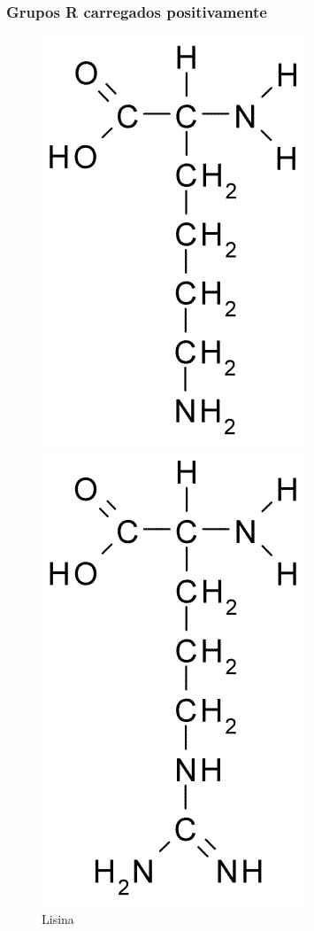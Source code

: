 \documentclass[a4paper,12pt]{article}
\begin{document}
 	\subsubsection*{Grupos R carregados positivamente}
 	\begin{figure}[H]
	 	\begin{center}
	 		\begin{minipage}{0.3\linewidth}
	 			\centering   
	 			\includegraphics[width=0.7\linewidth]{lysine.png}	
	 			\caption{Lisina}
	 			\label{fig:lysine}
	 		\end{minipage}
	 		\begin{minipage}{0.3\linewidth}
	 			\centering   
	 			\includegraphics[width=0.59\linewidth]{arginine.png}

\end{minipage}
\end{center}
\end{figure}
\end{document}

